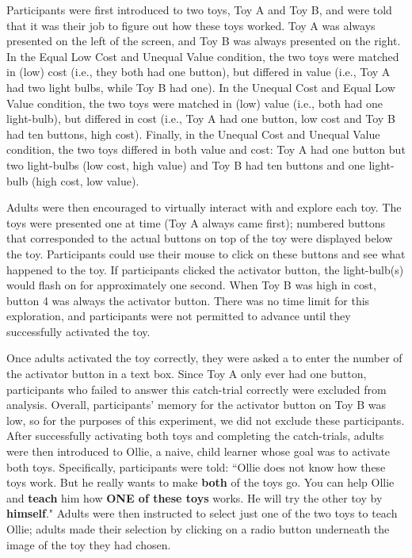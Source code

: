 \documentclass[10pt,letterpaper]{article}
\begin{document}
Participants were first introduced to two toys, Toy A and Toy B, and were told that it was their job to figure out how these toys worked. Toy A was always presented on the left of the screen, and Toy B was always presented on the right. In the Equal Low Cost and Unequal Value condition, the two toys were matched in (low) cost (i.e., they both had one button), but differed in value (i.e., Toy A had two light bulbs, while Toy B had one). In the Unequal Cost and Equal Low Value condition, the two toys were matched in (low) value (i.e., both had one light-bulb), but differed in cost (i.e., Toy A had one button, low cost and Toy B had ten buttons, high cost). Finally, in the Unequal Cost and Unequal Value condition, the two toys differed in both value and cost: Toy A had one button but two light-bulbs (low cost, high value) and Toy B had ten buttons and one light-bulb (high cost, low value). 

Adults were then encouraged to virtually interact with and explore each toy. The toys were presented one at time (Toy A always came first); numbered buttons that corresponded to the actual buttons on top of the toy were displayed below the toy. Participants could use their mouse to click on these buttons and see what happened to the toy. If participants clicked the activator button, the light-bulb(s) would flash on for approximately one second. When Toy B was high in cost, button 4 was always the activator button. There was no time limit for this exploration, and participants were not permitted to advance until they successfully activated the toy. 

Once adults activated the toy correctly, they were asked a to enter the number of the activator button in a text box. Since Toy A only ever had one button, participants who failed to answer this catch-trial correctly were excluded from analysis. Overall, participants' memory for the activator button on Toy B was low, so for the purposes of this experiment, we did not exclude these participants. After successfully activating both toys and completing the catch-trials, adults were then introduced to Ollie, a naive, child learner whose goal was to activate both toys. Specifically, participants were told: ``Ollie does not know how these toys work. But he really wants to make \textbf{both} of the toys go. You can help Ollie and \textbf{teach} him how \textbf{ONE of these toys} works. He will try the other toy by \textbf{himself}." Adults were then instructed to select just one of the two toys to teach Ollie; adults made their selection by clicking on a radio button underneath the image of the toy they had chosen. 
\end{document}
